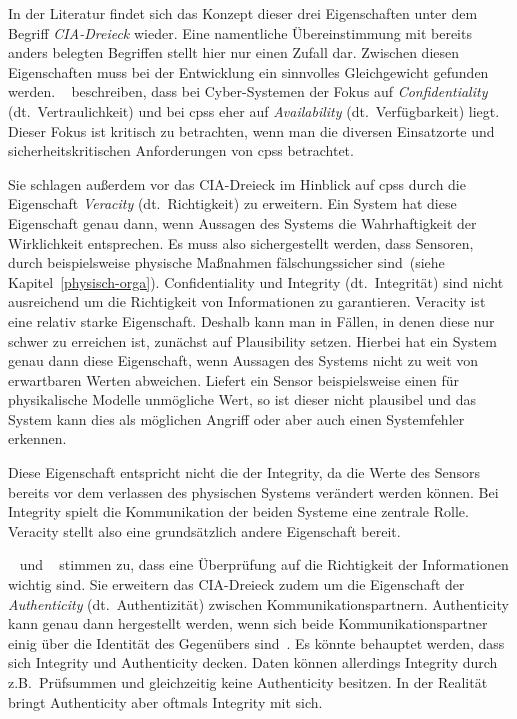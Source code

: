 \documentclass[final,bibliography=totocnumbered]{include/sikseminar}
\newcommand{\cps}{\glspl{cps}\xspace}
\begin{document}
    In der Literatur findet sich das Konzept dieser drei Eigenschaften unter dem Begriff \textit{CIA-Dreieck} wieder.
    Eine namentliche Übereinstimmung mit bereits anders belegten Begriffen stellt hier nur einen Zufall dar.
    Zwischen diesen Eigenschaften muss bei der Entwicklung ein sinnvolles Gleichgewicht gefunden werden.
    \citeauthor{GK16}~\cite{GK16} beschreiben, dass bei Cyber-Systemen der Fokus auf \textit{Confidentiality} (dt.\ Vertraulichkeit) und bei \cps eher auf \textit{Availability} (dt.\ Verfügbarkeit) liegt.
    Dieser Fokus ist kritisch zu betrachten, wenn man die diversen Einsatzorte und sicherheitskritischen Anforderungen von \cps betrachtet.

    Sie schlagen außerdem vor das CIA-Dreieck im Hinblick auf \cps durch die Eigenschaft \textit{Veracity} (dt.~Richtigkeit) zu erweitern.
    Ein System hat diese Eigenschaft genau dann, wenn Aussagen des Systems die Wahrhaftigkeit der Wirklichkeit entsprechen.
    Es muss also sichergestellt werden, dass Sensoren, durch beispielsweise physische Maßnahmen fälschungssicher sind~(siehe Kapitel~\ref{physisch-orga}).
    Confidentiality und Integrity (dt.\ Integrität) sind nicht ausreichend um die Richtigkeit von Informationen zu garantieren.
    Veracity ist eine relativ starke Eigenschaft.
    Deshalb kann man in Fällen, in denen diese nur schwer zu erreichen ist, zunächst auf Plausibility setzen.
    Hierbei hat ein System genau dann diese Eigenschaft, wenn Aussagen des Systems nicht zu weit von erwartbaren Werten abweichen.
    Liefert ein Sensor beispielsweise einen für physikalische Modelle unmögliche Wert, so ist dieser nicht plausibel und das System kann dies als möglichen Angriff oder aber auch einen Systemfehler erkennen.~\cite{GK16,KLG15}

    Diese Eigenschaft entspricht nicht die der Integrity, da die Werte des Sensors bereits vor dem verlassen des physischen Systems verändert werden können.
    Bei Integrity spielt die Kommunikation der beiden Systeme eine zentrale Rolle.
    Veracity stellt also eine grundsätzlich andere Eigenschaft bereit.

    \citeauthor{WYX+10}~\cite{WYX+10} und \citeauthor{SFJ17}~\cite{SFJ17} stimmen zu, dass eine Überprüfung auf die Richtigkeit der Informationen wichtig sind.
    Sie erweitern das CIA-Dreieck zudem um die Eigenschaft der \textit{Authenticity} (dt.\ Authentizität) zwischen Kommunikationspartnern.
    Authenticity kann genau dann hergestellt werden, wenn sich beide Kommunikationspartner einig über die Identität des Gegenübers sind~\cite{CH13}.
    Es könnte behauptet werden, dass sich Integrity und Authenticity decken.
    Daten können allerdings Integrity durch z.B.\ Prüfsummen und gleichzeitig keine Authenticity besitzen.
    In der Realität bringt Authenticity aber oftmals Integrity mit sich.
\end{document}
